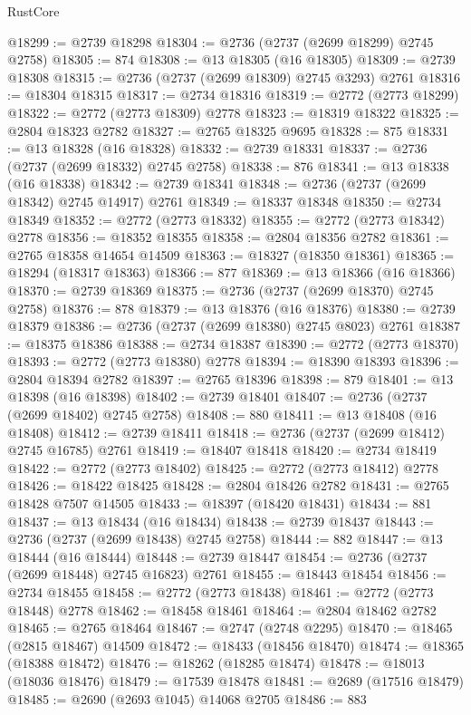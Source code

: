 \begin{lexlean}{RustCore}
\begin{coremodule}
@18299 := @2739 @18298
@18304 := @2736 (@2737 (@2699 @18299) @2745 @2758)
@18305 := 874
@18308 := @13 @18305 (@16 @18305)
@18309 := @2739 @18308
@18315 := @2736 (@2737 (@2699 @18309) @2745 @3293) @2761
@18316 := @18304 @18315
@18317 := @2734 @18316
@18319 := @2772 (@2773 @18299)
@18322 := @2772 (@2773 @18309) @2778
@18323 := @18319 @18322
@18325 := @2804 @18323 @2782
@18327 := @2765 @18325 @9695
@18328 := 875
@18331 := @13 @18328 (@16 @18328)
@18332 := @2739 @18331
@18337 := @2736 (@2737 (@2699 @18332) @2745 @2758)
@18338 := 876
@18341 := @13 @18338 (@16 @18338)
@18342 := @2739 @18341
@18348 := @2736 (@2737 (@2699 @18342) @2745 @14917) @2761
@18349 := @18337 @18348
@18350 := @2734 @18349
@18352 := @2772 (@2773 @18332)
@18355 := @2772 (@2773 @18342) @2778
@18356 := @18352 @18355
@18358 := @2804 @18356 @2782
@18361 := @2765 @18358 @14654 @14509
@18363 := @18327 (@18350 @18361)
@18365 := @18294 (@18317 @18363)
@18366 := 877
@18369 := @13 @18366 (@16 @18366)
@18370 := @2739 @18369
@18375 := @2736 (@2737 (@2699 @18370) @2745 @2758)
@18376 := 878
@18379 := @13 @18376 (@16 @18376)
@18380 := @2739 @18379
@18386 := @2736 (@2737 (@2699 @18380) @2745 @8023) @2761
@18387 := @18375 @18386
@18388 := @2734 @18387
@18390 := @2772 (@2773 @18370)
@18393 := @2772 (@2773 @18380) @2778
@18394 := @18390 @18393
@18396 := @2804 @18394 @2782
@18397 := @2765 @18396
@18398 := 879
@18401 := @13 @18398 (@16 @18398)
@18402 := @2739 @18401
@18407 := @2736 (@2737 (@2699 @18402) @2745 @2758)
@18408 := 880
@18411 := @13 @18408 (@16 @18408)
@18412 := @2739 @18411
@18418 := @2736 (@2737 (@2699 @18412) @2745 @16785) @2761
@18419 := @18407 @18418
@18420 := @2734 @18419
@18422 := @2772 (@2773 @18402)
@18425 := @2772 (@2773 @18412) @2778
@18426 := @18422 @18425
@18428 := @2804 @18426 @2782
@18431 := @2765 @18428 @7507 @14505
@18433 := @18397 (@18420 @18431)
@18434 := 881
@18437 := @13 @18434 (@16 @18434)
@18438 := @2739 @18437
@18443 := @2736 (@2737 (@2699 @18438) @2745 @2758)
@18444 := 882
@18447 := @13 @18444 (@16 @18444)
@18448 := @2739 @18447
@18454 := @2736 (@2737 (@2699 @18448) @2745 @16823) @2761
@18455 := @18443 @18454
@18456 := @2734 @18455
@18458 := @2772 (@2773 @18438)
@18461 := @2772 (@2773 @18448) @2778
@18462 := @18458 @18461
@18464 := @2804 @18462 @2782
@18465 := @2765 @18464
@18467 := @2747 (@2748 @2295)
@18470 := @18465 (@2815 @18467) @14509
@18472 := @18433 (@18456 @18470)
@18474 := @18365 (@18388 @18472)
@18476 := @18262 (@18285 @18474)
@18478 := @18013 (@18036 @18476)
@18479 := @17539 @18478
@18481 := @2689 (@17516 @18479)
@18485 := @2690 (@2693 @1045) @14068 @2705
@18486 := 883

\end{coremodule}
\end{lexlean}
